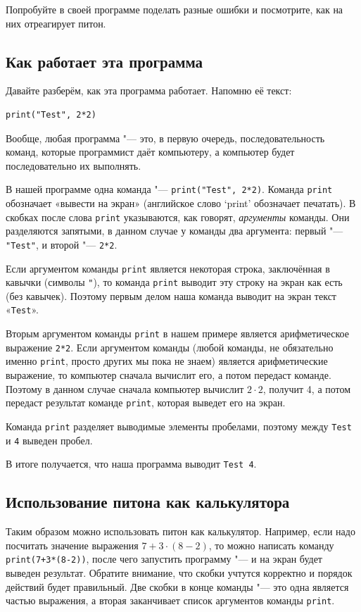 Попробуйте в своей программе поделать разные ошибки и посмотрите, как на них отреагирует питон. 

\subsection{Как работает эта программа}

Давайте разберём, как эта программа работает. Напомню её текст:
\begin{verbatim}
print("Test", 2*2)
\end{verbatim}

Вообще, любая программа "--- это, в первую очередь, последовательность команд, которые программист 
даёт компьютеру, а компьютер будет последовательно их выполнять. 

В нашей программе одна команда "--- \verb`print("Test", 2*2)`. Команда 
\verb`print` обозначает «вывести на экран» (английское слово `print' обозначает печатать). 
В скобках после слова \verb`print` указываются, как 
говорят, \textit{аргументы} команды. Они разделяются запятыми, в данном случае у команды два 
аргумента: первый "--- \verb`"Test"`, и второй "--- \verb`2*2`. 

Если аргументом команды \verb`print` является некоторая строка, заключённая в кавычки (символы \verb`"`), то 
команда \verb`print` выводит эту строку на экран как есть (без кавычек). Поэтому первым делом наша команда 
выводит на экран текст «\verb`Test`».

Вторым аргументом команды \verb`print` в нашем примере является арифметическое выражение 
\verb`2*2`. Если аргументом команды (любой команды, не обязательно именно \verb`print`, 
просто других мы 
пока не знаем) является арифметические выражение, то компьютер сначала вычислит его, а потом 
передаст команде. Поэтому в данном случае сначала компьютер вычислит $2\cdot 2$, получит 4, а потом 
передаст результат команде \verb`print`, которая выведет его на экран. 

Команда \verb`print` разделяет выводимые элементы пробелами, поэтому между \verb`Test` и \verb`4`
выведен пробел.

В итоге получается, что наша программа выводит \verb`Test 4`.

\subsection{Использование питона как калькулятора}

Таким образом можно использовать питон как калькулятор. Например, если надо посчитать значение 
выражения $7+3\cdot(8-2)$, то можно написать команду \verb`print(7+3*(8-2))`, 
после чего запустить программу "--- и на экран будет выведен результат. Обратите 
внимание, что скобки учтутся корректно и порядок действий будет правильный. Две скобки в конце команды "--- это одна 
является частью выражения, а вторая заканчивает список аргументов команды \verb`print`.

